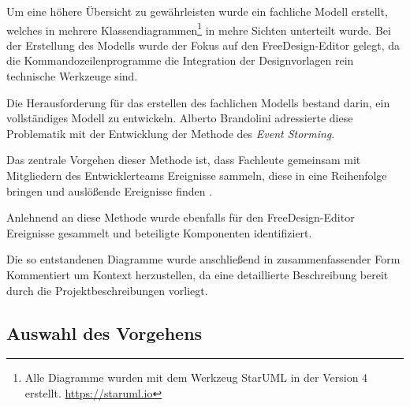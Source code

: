 Um eine höhere Übersicht zu gewährleisten wurde ein fachliche Modell erstellt, welches in mehrere Klassendiagrammen\footnote{Alle Diagramme wurden mit dem Werkzeug StarUML in der Version 4 erstellt. \url{https://staruml.io}} in mehre Sichten unterteilt wurde. Bei der Erstellung des Modells wurde der Fokus auf den FreeDesign-Editor gelegt, da die Kommandozeilenprogramme die Integration der Designvorlagen rein technische Werkzeuge sind. 

Die Herausforderung für das erstellen des fachlichen Modells bestand darin, ein vollständiges Modell zu entwickeln. Alberto Brandolini adressierte diese Problematik mit der Entwicklung der Methode des \emph{Event Storming}. 

Das zentrale Vorgehen dieser Methode ist, dass Fachleute gemeinsam mit Mitgliedern des Entwicklerteams Ereignisse sammeln, diese in eine Reihenfolge bringen und auslößende Ereignisse finden \autocite[vgl.][]{Brandolini2013}. 

Anlehnend an diese Methode wurde ebenfalls für den FreeDesign-Editor Ereignisse gesammelt und beteiligte Komponenten identifiziert. 

Die so entstandenen Diagramme wurde anschließend in zusammenfassender Form Kommentiert um Kontext herzustellen, da eine detaillierte Beschreibung bereit durch die Projektbeschreibungen vorliegt.


\subsection{Auswahl des Vorgehens}

